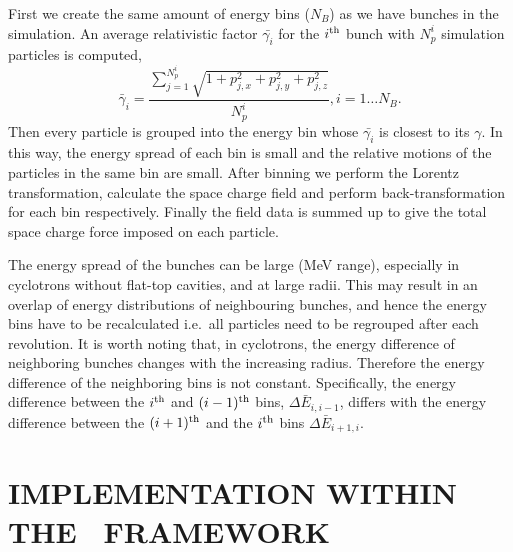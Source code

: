 \documentclass[aps,prstab,onecolumn,superscriptaddress,showpacs]{revtex4}
\begin{document}
First we create the same amount of energy bins ($N_B$) as we have bunches in the simulation. 
An average relativistic factor $\bar{\gamma_i}$ for the $i^{\rm th}$ bunch with $N_p^i$ simulation particles is computed,
\begin{equation}\label{eq:dR1}
  \bar{\gamma}_i = \frac{\sum_{j=1}^{N_p^i}\sqrt{1+p_{j,x}^2+p_{j,y}^2+p_{j,z}^2}}{N_p^i}, i=1\dots N_B.
\end{equation}
Then every particle is grouped into the energy bin whose $\bar{\gamma_i}$ is closest to its $\gamma$.
In this way, the energy spread of each bin is small and the relative motions of the particles in the same bin are 
small.
After binning we perform the Lorentz transformation, calculate the space charge field and perform back-transformation for each bin respectively. 
Finally the field data is summed up to give  the total space charge force imposed on each particle.

The energy spread of the bunches can be large (MeV range), especially in cyclotrons without flat-top cavities, and at large radii. This may result in an overlap of 
energy distributions of neighbouring bunches, and hence the energy bins have to be recalculated i.e.\ all particles need to be regrouped after each revolution.
It is worth noting that, in cyclotrons, the energy difference of neighboring bunches changes  with the increasing radius.
Therefore the energy difference of the neighboring bins is not constant. 
Specifically, the energy difference between the $i^{\rm th}$  and $(i-1)^{\rm th}$ bins, $\Delta\bar{E}_{i,i-1}$, 
differs with the energy difference between the $(i+1)^{\rm th}$ and the $i^{\rm th}$ bins $\Delta\bar{E}_{i+1,i}$.

\section{IMPLEMENTATION WITHIN THE \opal \  FRAMEWORK}

\end{document}
